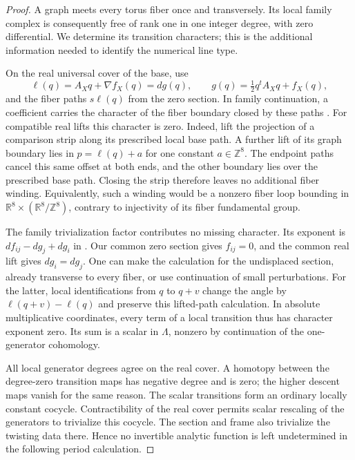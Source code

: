 \documentclass[11pt]{article}
\theoremstyle{definition}
\theoremstyle{remark}
\numberwithin{equation}{section}
\begin{document}
\begin{proof}
A graph meets every torus fiber once and transversely.  Its local
family complex is consequently free of rank one in one integer
degree, with zero differential.  We determine its transition
characters; this is the additional information needed to identify
the numerical line type.

On the real universal cover of the base, use
\[
 \ell(q)=A_Xq+\nabla f_X(q)=dg(q),\qquad
 g(q)=\tfrac12q^tA_Xq+f_X(q),
\]
and the fiber paths $s\ell(q)$ from the zero section.  In family
continuation, a coefficient carries the character of the fiber
boundary closed by these paths
\cite[\S\S2.2 and 8.2]{abouzaid-faithful}.  For compatible real lifts
this character is zero.  Indeed, lift the projection of a comparison
strip along its prescribed local base path.  A further lift of its
graph boundary lies in
$p=\ell(q)+a$ for one constant $a\in\mathbb Z^8$.  The endpoint paths cancel
this same offset at both ends, and the other boundary lies over the
prescribed base path.  Closing the strip therefore leaves no
additional fiber winding.  Equivalently, such a winding would be a
nonzero fiber loop bounding in
$\mathbb R^8\times(\mathbb R^8/\mathbb Z^8)$, contrary to injectivity of its fiber
fundamental group.

The family trivialization factor contributes no missing character.
Its exponent is $df_{ij}-dg_j+dg_i$ in
\cite[Equation~(8.16)]{abouzaid-faithful}.  Our common zero section
gives $f_{ij}=0$, and the common real lift gives $dg_i=dg_j$.
One can make the calculation for the undisplaced section, already
transverse to every fiber, or use continuation of small perturbations.
For the latter, local identifications from $q$ to $q+v$ change the
angle by $\ell(q+v)-\ell(q)$ and preserve this lifted-path calculation.
In absolute multiplicative coordinates, every term of a local
transition thus has character exponent zero.  Its sum is a scalar
in $\Lambda$, nonzero by continuation of the one-generator
cohomology.

All local generator degrees agree on the real cover.  A homotopy
between the degree-zero transition maps has negative degree and is
zero; the higher descent maps vanish for the same reason.  The
scalar transitions form an ordinary locally constant cocycle.
Contractibility of the real cover permits scalar rescaling of the
generators to trivialize this cocycle.  The section and frame also
trivialize the twisting data there.  Hence no invertible analytic
function is left undetermined in the following period calculation.


\end{proof}
\end{document}
